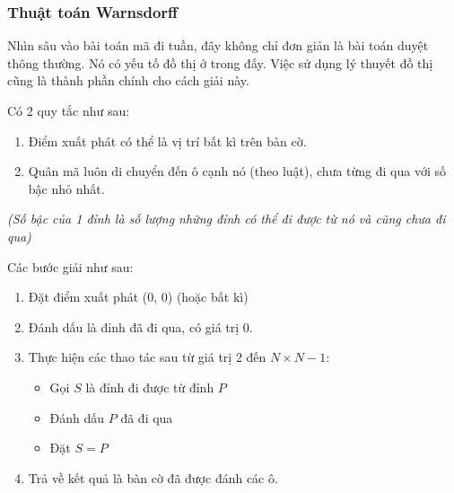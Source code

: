 \documentclass[
]{article}
\providecommand{\tightlist}{%
  \setlength{\itemsep}{0pt}\setlength{\parskip}{0pt}}
\begin{document}
\hypertarget{thuux1eadt-touxe1n-warnsdorff}{%
\subsubsection{\texorpdfstring{Thuật toán
\textbf{Warnsdorff}}{Thuật toán Warnsdorff}}\label{thuux1eadt-touxe1n-warnsdorff}}

Nhìn sâu vào bài toán mã đi tuần, đây không chỉ đơn giản là bài toán
duyệt thông thường. Nó có yếu tố đồ thị ở trong đấy. Việc sử dụng lý
thuyết đồ thị cũng là thành phần chính cho cách giải này.

Có 2 quy tắc như sau:

\begin{enumerate}
\def\labelenumi{\arabic{enumi}.}
\tightlist
\item
  Điểm xuất phát có thể là vị trí bất kì trên bàn cờ.
\item
  Quân mã luôn di chuyển đến ô cạnh nó (theo luật), chưa từng đi qua với
  số bậc nhỏ nhất.
\end{enumerate}

\emph{(Số bậc của 1 đỉnh là số lượng những đỉnh có thể đi được từ nó và
cũng chưa đi qua)}

Các bước giải như sau:

\begin{enumerate}
\def\labelenumi{\arabic{enumi}.}
\tightlist
\item
  Đặt điểm xuất phát (0, 0) (hoặc bất kì)
\item
  Đánh dấu là đỉnh đã đi qua, có giá trị 0.
\item
  Thực hiện các thao tác sau từ giá trị 2 đến \(N\times N-1\):

  \begin{itemize}
  \tightlist
  \item
    Gọi \(S\) là đỉnh đi được từ đỉnh \(P\)
  \item
    Đánh dấu \(P\) đã đi qua
  \item
    Đặt \(S=P\)
  \end{itemize}
\item
  Trả về kết quả là bàn cờ đã được đánh các ô.
\end{enumerate}
\end{document}
